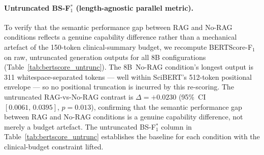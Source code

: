 
\paragraph{Untruncated BS-F$_1^*$ (length-agnostic parallel metric).}
To verify that the semantic performance gap between RAG and No-RAG
conditions reflects a genuine capability difference rather than a
mechanical artefact of the 150-token clinical-summary budget, we
recompute BERTScore-F$_1$ on raw, untruncated generation outputs for
all 8B configurations (Table~\ref{tab:bertscore_untrunc}).
The 8B~No-RAG condition's longest output is 311 whitespace-separated
tokens --- well within SciBERT's 512-token positional envelope ---
so no positional truncation is incurred by this re-scoring.
The untruncated RAG-vs-No-RAG contrast is
$\Delta = +0.0230$
(95\%~CI~$[0.0061,\, 0.0395]$, $p=0.013$),
confirming that the semantic performance gap between RAG and No-RAG conditions is a genuine capability difference, not merely a budget artefact.
The untruncated BS-F$_1^*$ column in Table~\ref{tab:bertscore_untrunc}
establishes the baseline for each condition with the clinical-budget
constraint lifted.
